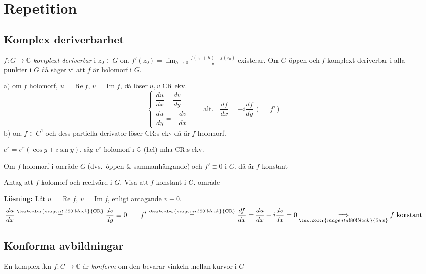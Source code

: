 \section{Repetition}
\subsection{Komplex deriverbarhet}
$f : G \to \mathbb{C}$ \emph{komplext deriverbar} i $z_0 \in G$ om $f'(z_0) = \displaystyle\lim_{h \to 0} \frac{f(z_0 + h) - f(z_0)}{h}$ existerar. Om $G$ öppen och $f$ komplext deriverbar i alla punkter i $G$ då säger vi att $f$ är holomorf i $G$.

\begin{theorem}
a) om $f$ holomorf, $u = \operatorname{Re} f$, $v = \operatorname{Im} f$, då löser $u, v$ CR ekv.
\[ \begin{cases} \dfrac{du}{dx} = \dfrac{dv}{dy} \\[2ex] \dfrac{du}{dy} = -\dfrac{dv}{dx} \end{cases} \qquad \text{alt.} \quad \frac{df}{dx} = -i\frac{df}{dy} \ (= f') \]
b) om $f \in C^1$ och dess partiella derivator löser CR:s ekv då är $f$ holomorf.
\end{theorem}

\begin{example}
$e^z = e^x(\cos y + i\sin y)$, såg $e^z$ holomorf i $\mathbb{C}$ (hel) mha CR:s ekv.
\end{example}

\begin{theorem}[Sats 2.17]
Om $f$ holomorf i område $G$ (dvs.\ öppen \& sammanhängande) och $f' \equiv 0$ i $G$, då är $f$ konstant
\end{theorem}

\begin{example}
Antag att $f$ holomorf och reellvärd i $G$. Visa att $f$ konstant i $G$. \hfill \textcolor{magenta!80!black}{område}

\textbf{Lösning:} Låt $u = \operatorname{Re} f$, $v = \operatorname{Im} f$, enligt antagande $v \equiv 0$.
\[ \frac{du}{dx} \overset{\textcolor{magenta!80!black}{\text{CR}}}{=} \frac{dv}{dy} \equiv 0 \qquad f' \overset{\textcolor{magenta!80!black}{\text{CR}}}{=} \frac{df}{dx} = \frac{du}{dx} + i\frac{dv}{dx} = 0 \underset{\textcolor{magenta!80!black}{\text{Sats}}}{\Longrightarrow} f \text{ konstant} \]
\end{example}

\subsection{Konforma avbildningar}
\begin{definition}
En komplex fkn $f : G \to \mathbb{C}$ är \emph{konform} om den bevarar vinkeln mellan kurvor i $G$
\end{definition}

